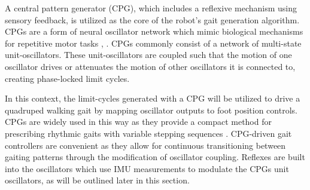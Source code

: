 		A central pattern generator (CPG), which includes a reflexive mechanism using sensory feedback, is utilized as the core of the robot's gait generation algorithm. CPGs are a form of neural oscillator network which mimic biological mechanisms for repetitive motor tasks \cite{Ijspeert2008}, \cite{Collins1993}. CPGs commonly consist of a network of multi-state unit-oscillators. These unit-oscillators are coupled such that the motion of one oscillator drives or attenuates the motion of other oscillators it is connected to, creating phase-locked limit cycles.

		In this context, the limit-cycles generated with a CPG will be utilized to drive a quadruped  walking gait by mapping oscillator outputs to foot position controls. CPGs are widely used in this way as they provide a compact method for prescribing rhythmic gaits with variable stepping sequences 
		\cite{
			Righetti2006,
	 		Castro2008,
			Li2014
		}. 
		CPG-driven gait controllers are convenient as they allow for continuous transitioning between gaiting patterns through the modification of oscillator coupling. Reflexes are built into the oscillators which use IMU measurements to modulate the CPGs unit oscillators, as will be outlined later in this section.

